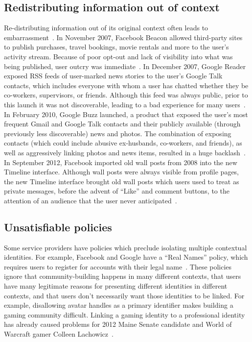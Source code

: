 \documentclass[10pt, conference, compsocconf]{IEEEtran}
\begin{document}
\subsection{Redistributing information out of context}
Re-distributing information out of its original context often leads to
embarrassment~\cite{nissenbaum}.  In November 2007, Facebook Beacon allowed
third-party sites to publish purchases, travel bookings, movie rentals and more
to the user's activity stream.  Because of poor opt-out and lack of visibility
into what was being published, user outcry was
immediate~\cite{mccarthy,nakashima}.  In December 2007, Google Reader exposed
RSS feeds of user-marked news stories to the user's Google Talk contacts, which
includes everyone with whom a user has chatted whether they be co-workers,
supervisors, or friends. Although this feed was always public, prior to this
launch it was not discoverable, leading to a bad experience for many
users~\cite{helft}. In February 2010, Google Buzz launched, a product that
exposed the user's most frequent Gmail and Google Talk contacts and their
publicly available (through previously less discoverable) news and photos.  The
combination of exposing contacts (which could include abusive ex-husbands,
co-workers, and friends), as well as aggressively linking photos and news
items, resulted in a huge backlash~\cite{fugitivus,buzz}. In September 2012,
Facebook imported old wall posts from 2008 into the new Timeline interface.
Although wall posts were always visible from profile pages, the new Timeline
interface brought old wall posts which users used to treat as private messages,
before the advent of ``Like'' and comment buttons, to the attention of an
audience that the user never anticipated~\cite{timeline}.

\subsection{Unsatisfiable policies}
\label{sec:policies}
Some service providers have policies which preclude isolating multiple
contextual identities. For example, Facebook and Google have a ``Real Names''
policy, which requires users to register for accounts with their legal
name~\cite{fb_names,google_names}.  These policies ignore that
community-building happens in many different contexts, that users have many
legitimate reasons for presenting different identities in different contexts,
and that users don't necessarily want those identities to be linked. For
example, disallowing avatar handles as a primary identifier makes building a
gaming community difficult.  Linking a gaming identity to a professional
identity has already caused problems for 2012 Maine Senate candidate and World
of Warcraft gamer Colleen Lachowicz~\cite{maine}.
\end{document}
